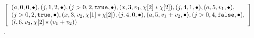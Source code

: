 \begin{example}
   \\
    $
    \left[\begin{array}{l}
     (a, 0, 0, \bullet),
    (j, 1, 2, \bullet),
    (j>0, 2, \etrue, \bullet),
    (x, 3, v_1, \chi[2]*\chi[2]),
    (j, 4, 1, \bullet),
    (a, 5, v_1, \bullet),\\
    (j>0, 2, \etrue, \bullet),
    (x, 3, v_2, \chi[1]*\chi[2]),
    (j, 4, 0, \bullet),
    (a, 5, v_1 + v_2, \bullet),
    (j>0, 4, \efalse, \bullet),\\
    (l, 6, v_3, \chi[2]*( v_1 + v_2))
    \end{array} \right]
    $.
\end{example}